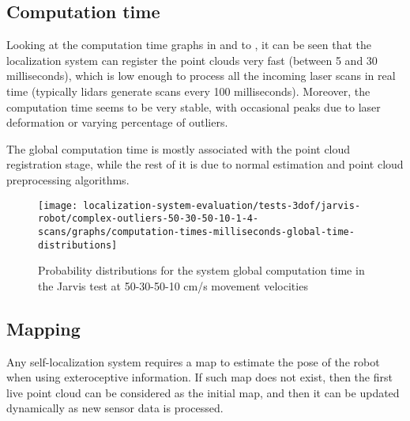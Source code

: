\subsection{Computation time}

Looking at the computation time graphs in  and to , it can be seen that the localization system can register the point clouds very fast (between 5 and 30 milliseconds), which is low enough to process all the incoming laser scans in real time (typically \glspl{lidar} generate scans every 100 milliseconds). Moreover, the computation time seems to be very stable, with occasional peaks due to laser deformation or varying percentage of outliers.

The global computation time is mostly associated with the point cloud registration stage, while the rest of it is due to normal estimation and point cloud preprocessing algorithms.

\begin{figure}[H]
	\centering
	\texttt{[image: localization-system-evaluation/tests-3dof/jarvis-robot/complex-outliers-50-30-50-10-1-4-scans/graphs/computation-times-milliseconds-global-time-distributions]}
	\caption{Probability distributions for the  system global computation time in the Jarvis test at 50-30-50-10 cm/s movement velocities}
	\label{fig:localization-system-evaluation_complex-path-with-outliers-50-30-50-10cm-per-sec-velocity-1-4-scans-computation-time}
\end{figure}


\subsection{Mapping}

Any self-localization system requires a map to estimate the pose of the robot when using exteroceptive information. If such map does not exist, then the first live point cloud can be considered as the initial map, and then it can be updated dynamically as new sensor data is processed.

